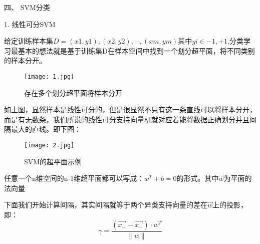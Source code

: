 \documentclass[UTF8]{article}
\begin{document}
{四、	SVM分类

1.	线性可分SVM

给定训练样本集$D=(x1,y1),(x2,y2),\cdots,(xm,ym)$其中$yi\in{−1,+1}$,分类学习最基本的想法就是基于训练集D在样本空间中找到一个划分超平面，将不同类别的样本分开。

\begin{figure}[H]
	\centering
	\texttt{[image: 1.jpg]}
	\caption{存在多个划分超平面将样本分开}
\end{figure}

如上图，显然样本是线性可分的，但是很显然不只有这一条直线可以将样本分开，而是有无数条，我们所说的线性可分支持向量机就对应着能将数据正确划分并且间隔最大的直线。即下图：

\begin{figure}[H]
	\centering
	\texttt{[image: 2.jpg]}
	\caption{SVM的超平面示例}
\end{figure}

任意一个n维空间的n-1维超平面都可以写成：$w^T + b = 0$的形式。其中$\vec{w}$为平面的法向量

下面我们开始计算间隔，其实间隔就等于两个异类支持向量的差在$\vec{w}$上的投影，即：
\begin{equation}
	\gamma = \frac{(\overrightarrow{x_+}-\overrightarrow{x_-})\cdot w^T}{\lVert w \rVert}
\end{equation}

}
\end{document}
